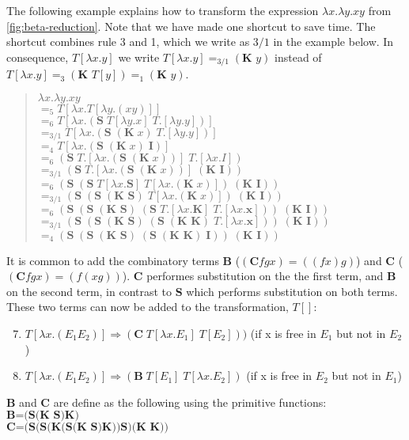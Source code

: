 \para
The following example explains how to transform the expression $\lambda x.\lambda y.xy$ from \autoref{fig:beta-reduction}. Note that we have made one shortcut to save time. The shortcut combines rule 3 and 1, which we write as $3/1$ in the example below.
In consequence, $T[\lambda x.y]$ we write $T[\lambda x.y] =_{3/1} (\textbf{K } y)$ instead of $T[\lambda x.y] =_{3} (\textbf{K } T[y]) =_{1} (\textbf{K } y)$.
\begin{quote}
    $\lambda x.\lambda y.xy$ \\
    $=_5 T[\lambda x.T[\lambda y.(xy)]]$ \\
    $=_6 T[\lambda x. (\textbf{S}\; T[\lambda y.x]\; T.[\lambda y.y])]$ \\
    $=_{3/1} T[\lambda x. (\textbf{S}\;(\textbf{K}\; x) \; T.[\lambda y.y])]$ \\  
    $=_4 T[\lambda x. (\textbf{S}\;(\textbf{K}\; x) \; \textbf{I})]$ \\
    $=_6 (\textbf{S} \; T.[\lambda x.(\textbf{S}\;(\textbf{K}\; x))] \; T.[\lambda x.I])$ \\
    $=_{3/1} (\textbf{S} \; T.[\lambda x.(\textbf{S}\;(\textbf{K}\; x))] \; (\textbf{K I}))$ \\
    $=_{6} (\textbf{S} \; (\textbf{S} \; T[\lambda x.\textbf{S}] \; T[\lambda x.(\textbf{K} \; x)]) \; (\textbf{K I}))$ \\
    $=_{3/1} (\textbf{S} \; (\textbf{S} \; (\textbf{K S}) \; T[\lambda x.(\textbf{K} \; x)]) \; (\textbf{K I}))$ \\
    $=_{6} (\textbf{S} \; (\textbf{S} \; (\textbf{K S}) \; (\textbf{S} \; T.[\lambda x.\textbf{K}] \; T.[\lambda x.\textbf{x}]) ) \; (\textbf{K I}))$ \\
    $=_{3/1} (\textbf{S} \; (\textbf{S} \; (\textbf{K S}) \; (\textbf{S} \; (\textbf{K K}) \; T.[\lambda x.\textbf{x}]) ) \; (\textbf{K I}))$ \\
    $=_4 (\textbf{S} \; (\textbf{S} \; (\textbf{K S}) \; (\textbf{S} \; (\textbf{K K}) \; \textbf{I}) ) \; (\textbf{K I}))$ \\      
\end{quote}
It is common to add the combinatory terms \textbf{B} ($(\textbf{C} f g x) = ((f x )g)$) 
and \textbf{C} ($(\textbf{C} f g x) = (f (x g))$). \textbf{C} performes substitution on the the first term, and \textbf{B} on the second term, in contrast to \textbf{S} which performs substitution on both terms. These two terms can now be added to the transformation, $T[]$:
\begin{enumerate}
    \setcounter{enumi}{6}
    \item $T[\lambda x.(E_1 E_2)] \Rightarrow (\textbf{C} \; T[\lambda x.E_1] \; T[E_2]))$ (if x is free in $E_1$ but not in $E_2$)
    \item $T[\lambda x.(E_1 E_2)] \Rightarrow (\textbf{B} \; T[E_1] \; T[\lambda x.E_2])$ (if x is free in $E_2$ but not in $E_1$)
\end{enumerate}
\textbf{B} and \textbf{C} are define as the following using the primitive functions:\\
$\textbf{B=(S(K S)K)}$\\
$\textbf{C=(S(S(K(S(K S)K))S)(K K))}$\\

